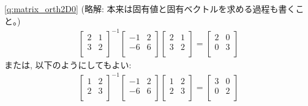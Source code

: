%
\ref{q:matrix_orth2D0} (略解: 本来は固有値と固有ベクトルを求める過程も書くこと。)
\begin{eqnarray}
\begin{bmatrix}
2 & 1\\
3 & 2\\
\end{bmatrix}^{-1}
\begin{bmatrix}
-1 & 2 \\
-6 & 6 \\
\end{bmatrix}
\begin{bmatrix}
2 & 1\\
3 & 2\\
\end{bmatrix}
=\begin{bmatrix}
2 & 0 \\
0 & 3 \\
\end{bmatrix}
\end{eqnarray}
または, 以下のようにしてもよい:
\begin{eqnarray}
\begin{bmatrix}
1 & 2\\
2 & 3\\
\end{bmatrix}^{-1}
\begin{bmatrix}
-1 & 2 \\
-6 & 6 \\
\end{bmatrix}
\begin{bmatrix}
1 & 2\\
2 & 3\\
\end{bmatrix}
=\begin{bmatrix}
3 & 0 \\
0 & 2 \\
\end{bmatrix}
\end{eqnarray}
\mv



